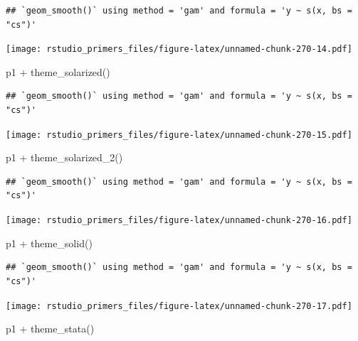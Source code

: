 \documentclass[
]{article}
\newenvironment{Shaded}{\begin{snugshade}}{\end{snugshade}}
\newcommand{\FunctionTok}[1]{\textcolor[rgb]{0.00,0.00,0.00}{#1}}
\newcommand{\NormalTok}[1]{#1}
\newcommand{\SpecialCharTok}[1]{\textcolor[rgb]{0.00,0.00,0.00}{#1}}
\begin{document}
\begin{verbatim}
## `geom_smooth()` using method = 'gam' and formula = 'y ~ s(x, bs = "cs")'
\end{verbatim}

\texttt{[image: rstudio\_primers\_files/figure-latex/unnamed-chunk-270-14.pdf]}

\begin{Shaded}
\begin{Highlighting}[]
\NormalTok{p1 }\SpecialCharTok{+} \FunctionTok{theme\_solarized}\NormalTok{()}
\end{Highlighting}
\end{Shaded}

\begin{verbatim}
## `geom_smooth()` using method = 'gam' and formula = 'y ~ s(x, bs = "cs")'
\end{verbatim}

\texttt{[image: rstudio\_primers\_files/figure-latex/unnamed-chunk-270-15.pdf]}

\begin{Shaded}
\begin{Highlighting}[]
\NormalTok{p1 }\SpecialCharTok{+} \FunctionTok{theme\_solarized\_2}\NormalTok{()}
\end{Highlighting}
\end{Shaded}

\begin{verbatim}
## `geom_smooth()` using method = 'gam' and formula = 'y ~ s(x, bs = "cs")'
\end{verbatim}

\texttt{[image: rstudio\_primers\_files/figure-latex/unnamed-chunk-270-16.pdf]}

\begin{Shaded}
\begin{Highlighting}[]
\NormalTok{p1 }\SpecialCharTok{+} \FunctionTok{theme\_solid}\NormalTok{()}
\end{Highlighting}
\end{Shaded}

\begin{verbatim}
## `geom_smooth()` using method = 'gam' and formula = 'y ~ s(x, bs = "cs")'
\end{verbatim}

\texttt{[image: rstudio\_primers\_files/figure-latex/unnamed-chunk-270-17.pdf]}

\begin{Shaded}
\begin{Highlighting}[]
\NormalTok{p1 }\SpecialCharTok{+} \FunctionTok{theme\_stata}\NormalTok{()}
\end{Highlighting}
\end{Shaded}
\end{document}
